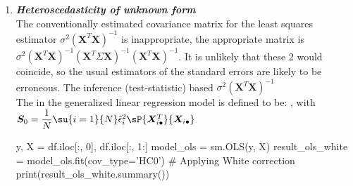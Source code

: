 \begin{enumerate}
	\item \textbf{\emph{Heteroscedasticity of unknown form}}\\
		 The conventionally estimated covariance matrix for the least squares estimator
		 $\sigma^{2}\left(\bm{X}^{T}\bm{X}\right)^{-1}$ is inappropriate, the appropriate
		 matrix is \\
		 $\sigma^{2}\left(\bm{X}^{T}\bm{X}\right)^{-1}\left(\bm{X}^{T}\Sigma
		 \bm{X}\right)^{-1}\left(\bm{X}^{T}\bm{X}\right)^{-1}$. It is unlikely that these 2 would coincide, so the usual estimators of the standard errors are 
		 likely to be erroneous. The inference (test-statistic) based $\sigma^{2}\left(
		 \bm{X}^{T}\bm{X}\right)^{-1}$\\
		 The  in the
		 generalized linear regression model is defined to be:
		 , with $\bm{S}_{0}=
		 \dfrac{1}{N}\su{{i=1}}{N}\hat{\epsilon}_{i}^{2}\sP{\bm{X}_{i\bullet}^{T}}{\bm{X}_{i\bullet}}$\\
\begin{python}
y, X = df.iloc[:, 0], df.iloc[:, 1:]
model_ols = sm.OLS(y, X)
result_ols_white = model_ols.fit(cov_type='HC0') # Applying White correction
print(result_ols_white.summary())
\end{python}


\end{enumerate}
